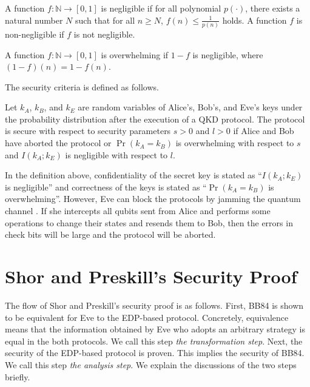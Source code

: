 \begin{defi}
 A function $f:\mathbb{N}\rightarrow [0, 1]$ is negligible if
 for all polynomial $p(\cdot)$, there exists a natural number
 $N$ such that for all $n \ge N$, $f(n) \le \frac{1}{p(n)}$ holds. 
 A function $f$ is non-negligible if $f$ is not negligible.
\end{defi}

\begin{defi}
 A function $f:\mathbb{N}\rightarrow [0, 1]$ is overwhelming
 if $1 - f$ is negligible, where $(1 - f)(n) = 1 - f(n)$.
\end{defi}
The security criteria is defined as follows.
\begin{defi}
 Let $k_A$, $k_B$, and $k_E$ are random variables
 of Alice's, Bob's, and Eve's keys under the probability 
 distribution after the execution of a QKD protocol.
 The protocol is secure with respect to
 security parameters $s > 0$ and $l > 0$ if
 Alice and Bob have aborted the protocol or
 $\Pr(k_A = k_B)$ is overwhelming with respect to $s$
 and $I(k_A;k_E)$ is negligible with respect to $l$.
\end{defi}

In the definition above, confidentiality of the secret key is 
stated as ``$I(k_A;k_E)$ is negligible'' and correctness of
the keys
is stated as ``$\Pr(k_A = k_B)$ is overwhelming''.
However, Eve can block the protocols by jamming the quantum channel
\cite{Mayers2001}.
If she intercepts all qubits sent from Alice and performs some operations
to change their states and resends them to Bob, then
the errors in check bits will be large and the protocol will be aborted.

\section{Shor and Preskill's Security Proof}
The flow of Shor and Preskill's security proof \cite{ShorPreskill2000}
is as follows. First, BB84 is shown to be equivalent for Eve to the
EDP-based protocol. Concretely, equivalence means that 
the information obtained by Eve who adopts
an arbitrary strategy is equal in the both protocols.
We call this step {\it the transformation step}.
Next, the security of the EDP-based protocol is proven. This implies
the security of BB84.
We call this step {\it the analysis step}.
We explain the discussions of the two steps briefly.

